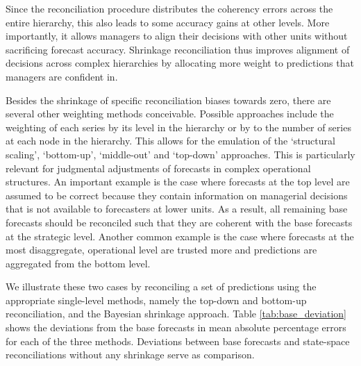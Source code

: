 \documentclass[a4paper,fleqn,11pt]{article}
\begin{document}
Since the reconciliation procedure distributes the coherency errors across the entire hierarchy, this also leads to some accuracy gains at other levels. More importantly, it allows managers to align their decisions with other units without sacrificing forecast accuracy. Shrinkage reconciliation thus improves alignment of decisions across complex hierarchies by allocating more weight to predictions that managers are confident in. 

Besides the shrinkage of specific reconciliation biases towards zero, there are several other weighting methods conceivable. Possible approaches include the weighting of each series by its level in the hierarchy or by to the number of series at each node in the hierarchy. This allows for the emulation of the `structural scaling', `bottom-up', `middle-out' and `top-down' approaches. This is particularly relevant for judgmental adjustments of forecasts in complex operational structures. An important example is the case where forecasts at the top level are assumed to be correct because they contain information on managerial decisions that is not available to forecasters at lower units. As a result, all remaining base forecasts should be reconciled such that they are coherent with the base forecasts at the strategic level. Another common example is the case where forecasts at the most disaggregate, operational level are trusted more and predictions are aggregated from the bottom level.

We illustrate these two cases by reconciling a set of predictions using the appropriate single-level methods, namely the top-down and bottom-up reconciliation, and the Bayesian shrinkage approach. Table \ref{tab:base_deviation} shows the deviations from the base forecasts in mean absolute percentage errors for each of the three methods. Deviations between base forecasts and state-space reconciliations without any shrinkage serve as comparison.
\end{document}
